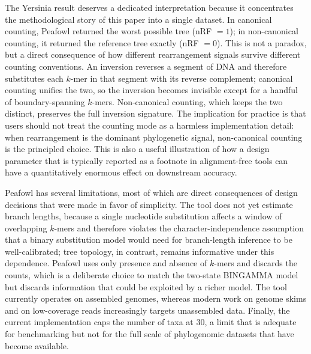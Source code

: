 \documentclass[11pt]{article}
\begin{document}
The Yersinia result deserves a dedicated interpretation because it
concentrates the methodological story of this paper into a single dataset.
In canonical counting, Peafowl returned the worst possible tree
(nRF $= 1$); in non-canonical counting, it returned the reference tree
exactly (nRF $= 0$).
This is not a paradox, but a direct consequence of how different
rearrangement signals survive different counting conventions. An inversion
reverses a segment of DNA and therefore substitutes each $k$-mer in that
segment with its reverse complement; canonical counting unifies the two,
so the inversion becomes invisible except for a handful of boundary-spanning
$k$-mers. Non-canonical counting, which keeps the two distinct, preserves
the full inversion signature. The implication for practice is that users
should not treat the counting mode as a harmless implementation detail:
when rearrangement is the dominant phylogenetic signal, non-canonical
counting is the principled choice. This is also a useful illustration of
how a design parameter that is typically reported as a footnote in
alignment-free tools can have a quantitatively enormous effect on
downstream accuracy.

Peafowl has several limitations, most of which are direct consequences of
design decisions that were made in favor of simplicity. The tool does not
yet estimate branch lengths, because a single nucleotide substitution
affects a window of overlapping $k$-mers and therefore violates the
character-independence assumption that a binary substitution model would
need for branch-length inference to be well-calibrated; tree topology, in
contrast, remains informative under this dependence. Peafowl uses only
presence and absence of $k$-mers and discards the counts, which is a
deliberate choice to match the two-state BINGAMMA model but discards
information that could be exploited by a richer model. The tool currently
operates on assembled genomes, whereas modern work on genome skims
\citep{sarmashghi2019skmer} and on low-coverage reads
\citep{lau2019readspam, yi2013cophylog} increasingly targets unassembled
data. Finally, the current implementation caps the number of taxa at 30,
a limit that is adequate for benchmarking but not for the full scale of
phylogenomic datasets that have become available.
\end{document}
